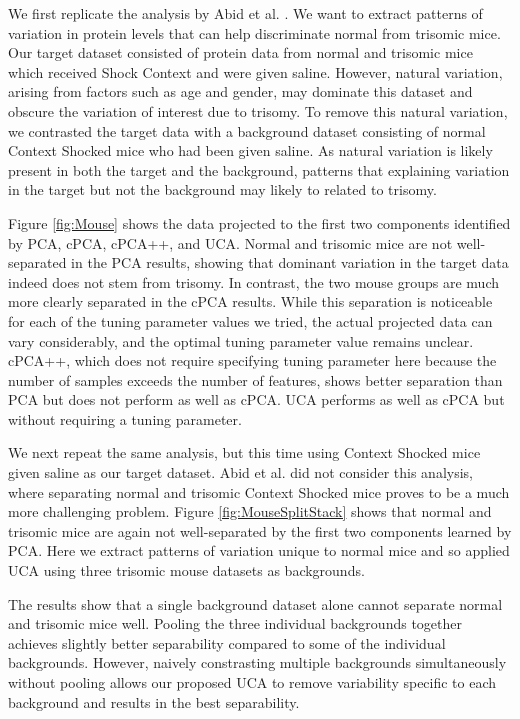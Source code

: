 \documentclass[nocrop]{bioinfo}
\begin{document}
\begin{methods}
We first replicate the analysis by Abid et al. \cite{Abid}. We want to extract patterns of variation in protein levels that can help discriminate normal from trisomic mice. Our target dataset consisted of protein data from normal and trisomic mice which received Shock Context and were given saline. However, natural variation, arising from factors such as age and gender, may dominate this dataset and obscure the variation of interest due to trisomy. To remove this natural variation, we contrasted the target data with a background dataset consisting of normal Context Shocked mice who had been given saline. As natural variation is likely present in both the target and the background, patterns that explaining variation in the target but not the background may likely to related to trisomy.

Figure \ref{fig:Mouse} shows the data projected to the first two components identified by PCA, cPCA, cPCA++, and UCA. Normal and trisomic mice are not well-separated in the PCA results, showing that dominant variation in the target data indeed does not stem from trisomy. In contrast, the two mouse groups are much more clearly separated in the cPCA results. While this separation is noticeable for each of the tuning parameter values we tried, the actual projected data can vary considerably, and the optimal tuning parameter value remains unclear.
cPCA++, which does not require specifying tuning parameter here because the number of samples exceeds the number of features, shows better separation than PCA but does not perform as well as cPCA. UCA performs as well as cPCA but without requiring a tuning parameter.


We next repeat the same analysis, but this time using Context Shocked mice given saline as our target dataset. Abid et al. \cite{Abid} did not consider this analysis, where separating normal and trisomic Context Shocked mice proves to be a much more challenging problem. Figure \ref{fig:MouseSplitStack} shows that normal and trisomic mice are again not well-separated by the first two components learned by PCA.
Here we extract patterns of variation unique to normal mice and so applied UCA using three trisomic mouse datasets as backgrounds.

The results show that a single background dataset alone cannot separate normal and trisomic mice well. Pooling the three individual backgrounds together achieves slightly better separability compared to some of the individual backgrounds. However, naively constrasting multiple backgrounds simultaneously without pooling allows our proposed UCA to remove variability specific to each background and results in the best separability.


\end{methods}
\end{document}

